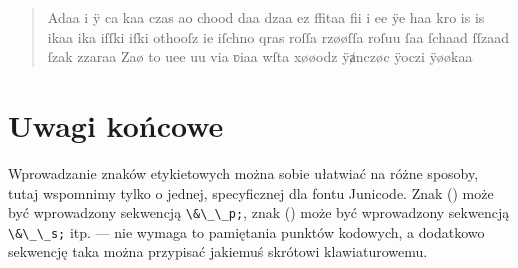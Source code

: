   \begin{quote}\raggedright
Adaa    
{}i{}
{}ÿ{}
ca{}
kaa{}
czas
a{}o
chood
daa{}
dzaa{}
ez
ffitaa
fii
i
ee
ÿe
haa
kro{}
{}is
{}is
{}ikaa
{}ika
{}iſſki
{}iſki
othooſz
{}ie
{}iſchno
q{}ras
roſſa
rzøøſſa
roſuu{}
ſaa{}
ſchaad
ſſzaad{}
ſzak 
zzaraa
Za{}{}ø
to
u{}ee
uu{}
vi{}a
ʋi{}aa{}
wſta
xøøodz
ÿⱥnczøc
ÿoczi
ÿøøkaa

  \end{quote}



\section{Uwagi końcowe}
\label{sec:uwagi-kocowe}

Wprowadzanie znaków etykietowych można sobie ułatwiać na różne
sposoby, tutaj wspomnimy tylko o jednej, specyficznej dla fontu
Junicode. Znak  
({}) może być wprowadzony sekwencją \verb|\&\_\_p;|, znak
  ({}) może
być wprowadzony sekwencją {\verb|\&\_\_s;|} itp. --- nie wymaga to
pamiętania punktów kodowych, a dodatkowo sekwencję taka można
przypisać jakiemuś skrótowi klawiaturowemu.

